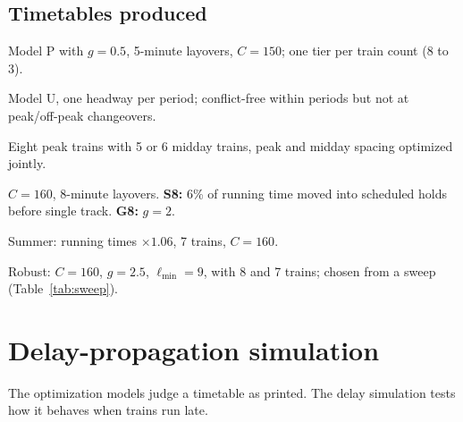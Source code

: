 \documentclass[11pt]{article}
\begin{document}
\subsection{Timetables produced}\label{sec:tts}
\begin{description}[itemsep=1pt]
\item[T8--T3] Model P with $g=0.5$, 5-minute layovers, $C=150$; one tier per train count (8 to 3).
\item[U8--U4] Model U, one headway per period; conflict-free within periods but not at peak/off-peak changeovers.
\item[E5, E6] Eight peak trains with 5 or 6 midday trains, peak and midday spacing optimized jointly.
\item[R8] $C=160$, 8-minute layovers. \textbf{S8:} 6\% of running time moved into scheduled holds before single track. \textbf{G8:} $g=2$.
\item[W7] Summer: running times $\times1.06$, 7 trains, $C=160$.
\item[B8, B7] Robust: $C=160$, $g=2.5$, $\ell_{\min}=9$, with 8 and 7 trains; chosen from a sweep (Table~\ref{tab:sweep}).
\end{description}

\section{Delay-propagation simulation}\label{sec:delay}
The optimization models judge a timetable as printed. The delay simulation tests how it behaves when trains run late.
\end{document}
